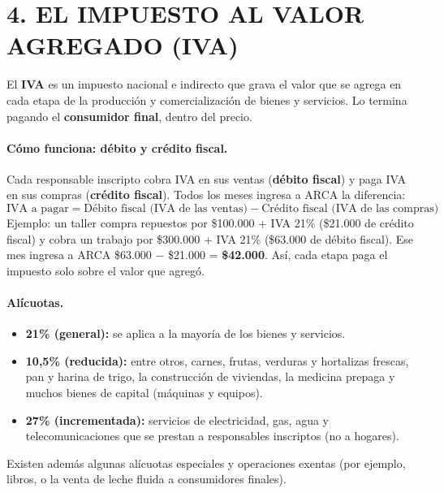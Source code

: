 \section*{4. EL IMPUESTO AL VALOR AGREGADO (IVA)}

\begin{recuadro}
El \textbf{IVA} es un impuesto nacional e indirecto que grava el valor que se agrega en cada
etapa de la producción y comercialización de bienes y servicios. Lo termina pagando el
\textbf{consumidor final}, dentro del precio.
\end{recuadro}

\paragraph*{Cómo funciona: débito y crédito fiscal.}
Cada responsable inscripto cobra IVA en sus ventas (\textbf{débito fiscal}) y paga IVA en
sus compras (\textbf{crédito fiscal}). Todos los meses ingresa a ARCA la diferencia:
\[
\mbox{IVA a pagar} = \mbox{Débito fiscal (IVA de las ventas)} - \mbox{Crédito fiscal (IVA de las compras)}
\]
Ejemplo: un taller compra repuestos por \$100.000 + IVA 21\% (\$21.000 de crédito fiscal) y
cobra un trabajo por \$300.000 + IVA 21\% (\$63.000 de débito fiscal). Ese mes ingresa a
ARCA \$63.000 $-$ \$21.000 = \textbf{\$42.000}. Así, cada etapa paga el impuesto solo
sobre el valor que agregó.

\paragraph*{Alícuotas.}
\begin{itemize}
  \item \textbf{21\% (general):} se aplica a la mayoría de los bienes y servicios.
  \item \textbf{10,5\% (reducida):} entre otros, carnes, frutas, verduras y hortalizas
        frescas, pan y harina de trigo, la construcción de viviendas, la medicina prepaga y
        muchos bienes de capital (máquinas y equipos).
  \item \textbf{27\% (incrementada):} servicios de electricidad, gas, agua y
        telecomunicaciones que se prestan a responsables inscriptos (no a hogares).
\end{itemize}
Existen además algunas alícuotas especiales y operaciones exentas (por ejemplo, libros, o
la venta de leche fluida a consumidores finales).

